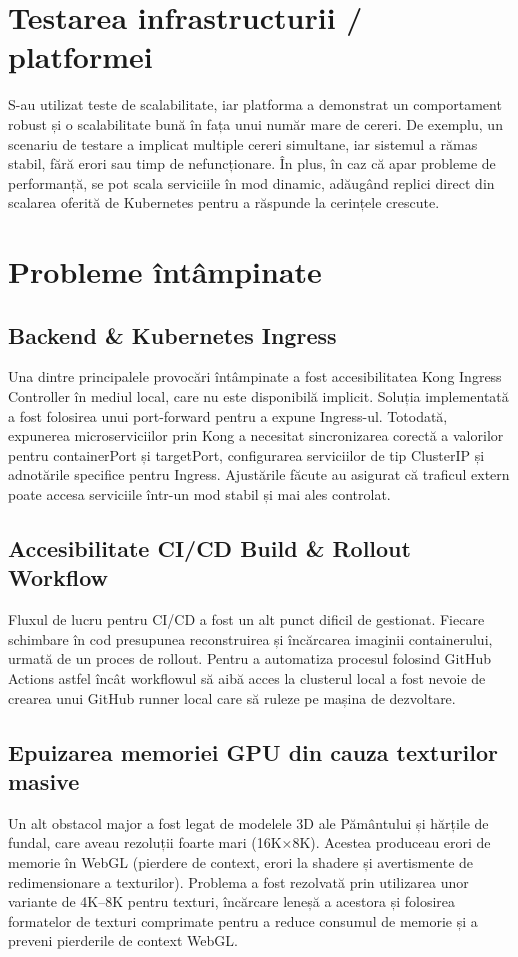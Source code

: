 \section{Testarea infrastructurii / platformei}
\label{subsec:evaluare-infrastructura}

S-au utilizat teste de scalabilitate, iar platforma a demonstrat un comportament robust și o scalabilitate bună
în fața unui număr mare de cereri. De exemplu, un scenariu de testare a implicat multiple cereri simultane, iar sistemul a rămas stabil,
fără erori sau timp de nefuncționare. În plus, în caz că apar probleme de performanță, se pot scala serviciile în mod dinamic, adăugând
replici direct din scalarea oferită de Kubernetes pentru a răspunde la cerințele crescute.

\section{Probleme întâmpinate}
\label{subsec:probleme}

\subsection{Backend \& Kubernetes Ingress}
Una dintre principalele provocări întâmpinate a fost accesibilitatea Kong Ingress Controller în mediul local, care nu este disponibilă implicit.
Soluția implementată a fost folosirea unui port-forward pentru a expune Ingress-ul. Totodată, expunerea microserviciilor prin Kong a 
necesitat sincronizarea corectă a valorilor pentru containerPort și targetPort, configurarea serviciilor de tip ClusterIP și adnotările 
specifice pentru Ingress. Ajustările făcute au asigurat că traficul extern poate accesa serviciile într-un mod stabil și mai ales controlat.

\subsection{Accesibilitate CI/CD Build \& Rollout Workflow}
Fluxul de lucru pentru CI/CD a fost un alt punct dificil de gestionat. Fiecare schimbare în cod presupunea reconstruirea și încărcarea
imaginii containerului, urmată de un proces de rollout. Pentru a automatiza procesul folosind GitHub Actions astfel încât workflowul
să aibă acces la clusterul local a fost nevoie de crearea unui GitHub runner local care să ruleze pe mașina de dezvoltare.

\subsection{Epuizarea memoriei GPU din cauza texturilor masive}
Un alt obstacol major a fost legat de modelele 3D ale Pământului și hărțile de fundal, care aveau rezoluții foarte mari (16K×8K).
Acestea produceau erori de memorie în WebGL (pierdere de context, erori la shadere și avertismente de redimensionare a texturilor). 
Problema a fost rezolvată prin utilizarea unor variante de 4K–8K pentru texturi, încărcare leneșă a acestora și folosirea formatelor
de texturi comprimate pentru a reduce consumul de memorie și a preveni pierderile de context WebGL.


